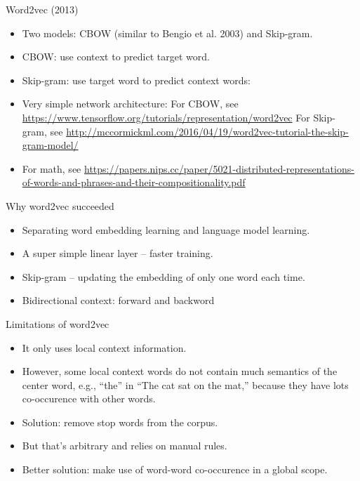 \documentclass[11pt,handout]{beamer}
\begin{document}
\begin{frame}{Word2vec (2013)}
\begin{itemize}[<+->]
 \item Two models: CBOW (similar to Bengio et al. 2003) and Skip-gram. 
 \item CBOW: use context to predict target word.  
 \item Skip-gram: use target word to predict context words: 
 \item Very simple network architecture: For CBOW, see \url{https://www.tensorflow.org/tutorials/representation/word2vec} For Skip-gram, see \url{http://mccormickml.com/2016/04/19/word2vec-tutorial-the-skip-gram-model/}
 \item For math, see \url{https://papers.nips.cc/paper/5021-distributed-representations-of-words-and-phrases-and-their-compositionality.pdf}
\end{itemize}
\end{frame}

\begin{frame}{Why word2vec succeeded}
\begin{itemize}[<+->]
   \item Separating word embedding learning and language model learning. 
   \item A super simple linear layer -- faster training. 
   \item Skip-gram -- updating the embedding of only one word each time. 
   \item Bidirectional context: forward and backword 
\end{itemize}
\end{frame}

\begin{frame}{Limitations of word2vec}
\begin{itemize}[<+->]
   \item It only uses local context information. 
   \item However, some local context words do not contain much semantics of the center word, e.g., ``the'' in ``The cat sat on the mat,'' because they have lots co-occurence with other words. 
   \item Solution: remove stop words from the corpus. 
   \item But that's arbitrary and relies on manual rules. 
   \item Better solution: make use of word-word co-occurence in a global scope. 
\end{itemize}
\end{frame}
\end{document}
